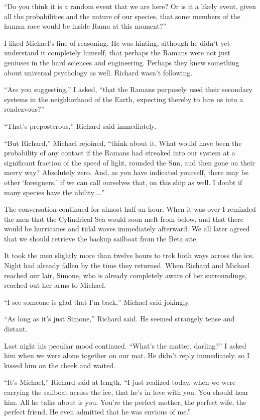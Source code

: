 \documentclass[]{article}
\begin{document}
“Do you think it is a random event that we are here? Or is it a likely event, given all the probabilities and the nature of our species, that some members of the human race would be inside Rama at this moment?”

I liked Michael’s line of reasoning.  He was hinting, although he didn’t yet understand it completely himself, that perhaps the Ramans were not just geniuses in the hard sciences and engineering.  Perhaps they knew something about universal psychology as well.  Richard wasn’t following.

“Are you suggesting,” I asked, “that the Ramans purposely used their secondary systems in the neighborhood of the Earth, expecting thereby to lure us into a rendezvous?”

“That’s preposterous,” Richard said immediately.

“But Richard,” Michael rejoined, “think about it.  What would have been the probability of any contact if the Ramans had streaked into our system at a significant fraction of the speed of light, rounded the Sun, and then gone on their merry way? Absolutely zero.  And, as you have indicated yourself, there may be other ‘foreigners,’ if we can call ourselves that, on this ship as well.  I doubt if many species have the ability …”

The conversation continued for almost half an hour.  When it was over I reminded the men that the Cylindrical Sea would soon melt from below, and that there would be hurricanes and tidal waves immediately afterward.  We all later agreed that we should retrieve the backup sailboat from the Beta site.

It took the men slightly more than twelve hours to trek both ways across the ice.  Night had already fallen by the time they returned.  When Richard and Michael reached our lair, Simone, who is already completely aware of her surroundings, reached out her arms to Michael.

“I see someone is glad that I’m back,” Michael said jokingly.

“As long as it’s just Simone,” Richard said.  He seemed strangely tense and distant.

Last night his peculiar mood continued.  “What’s the matter, darling?” I asked him when we were alone together on our mat.  He didn’t reply immediately, so I kissed him on the cheek and waited.

“It’s Michael,” Richard said at length.  “I just realized today, when we were carrying the sailboat across the ice, that he’s in love with you.  You should hear him.  All he talks about is you.  You’re the perfect mother, the perfect wife, the perfect friend.  He even admitted that he was envious of me.”
\end{document}
